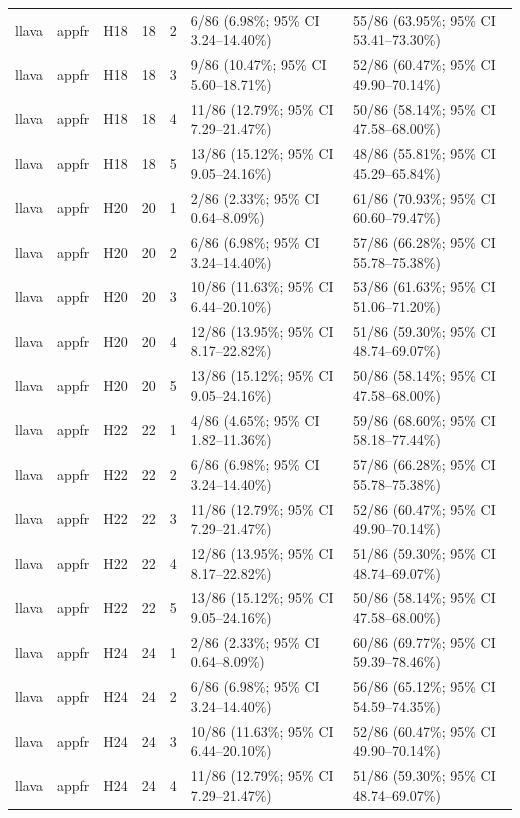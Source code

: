 \begin{longtable}{lllrrll}
llava & appfr & H18 & 18 & 2 & 6/86 (6.98\%; 95\% CI 3.24–14.40\%) & 55/86 (63.95\%; 95\% CI 53.41–73.30\%) \\
llava & appfr & H18 & 18 & 3 & 9/86 (10.47\%; 95\% CI 5.60–18.71\%) & 52/86 (60.47\%; 95\% CI 49.90–70.14\%) \\
llava & appfr & H18 & 18 & 4 & 11/86 (12.79\%; 95\% CI 7.29–21.47\%) & 50/86 (58.14\%; 95\% CI 47.58–68.00\%) \\
llava & appfr & H18 & 18 & 5 & 13/86 (15.12\%; 95\% CI 9.05–24.16\%) & 48/86 (55.81\%; 95\% CI 45.29–65.84\%) \\
llava & appfr & H20 & 20 & 1 & 2/86 (2.33\%; 95\% CI 0.64–8.09\%) & 61/86 (70.93\%; 95\% CI 60.60–79.47\%) \\
llava & appfr & H20 & 20 & 2 & 6/86 (6.98\%; 95\% CI 3.24–14.40\%) & 57/86 (66.28\%; 95\% CI 55.78–75.38\%) \\
llava & appfr & H20 & 20 & 3 & 10/86 (11.63\%; 95\% CI 6.44–20.10\%) & 53/86 (61.63\%; 95\% CI 51.06–71.20\%) \\
llava & appfr & H20 & 20 & 4 & 12/86 (13.95\%; 95\% CI 8.17–22.82\%) & 51/86 (59.30\%; 95\% CI 48.74–69.07\%) \\
llava & appfr & H20 & 20 & 5 & 13/86 (15.12\%; 95\% CI 9.05–24.16\%) & 50/86 (58.14\%; 95\% CI 47.58–68.00\%) \\
llava & appfr & H22 & 22 & 1 & 4/86 (4.65\%; 95\% CI 1.82–11.36\%) & 59/86 (68.60\%; 95\% CI 58.18–77.44\%) \\
llava & appfr & H22 & 22 & 2 & 6/86 (6.98\%; 95\% CI 3.24–14.40\%) & 57/86 (66.28\%; 95\% CI 55.78–75.38\%) \\
llava & appfr & H22 & 22 & 3 & 11/86 (12.79\%; 95\% CI 7.29–21.47\%) & 52/86 (60.47\%; 95\% CI 49.90–70.14\%) \\
llava & appfr & H22 & 22 & 4 & 12/86 (13.95\%; 95\% CI 8.17–22.82\%) & 51/86 (59.30\%; 95\% CI 48.74–69.07\%) \\
llava & appfr & H22 & 22 & 5 & 13/86 (15.12\%; 95\% CI 9.05–24.16\%) & 50/86 (58.14\%; 95\% CI 47.58–68.00\%) \\
llava & appfr & H24 & 24 & 1 & 2/86 (2.33\%; 95\% CI 0.64–8.09\%) & 60/86 (69.77\%; 95\% CI 59.39–78.46\%) \\
llava & appfr & H24 & 24 & 2 & 6/86 (6.98\%; 95\% CI 3.24–14.40\%) & 56/86 (65.12\%; 95\% CI 54.59–74.35\%) \\
llava & appfr & H24 & 24 & 3 & 10/86 (11.63\%; 95\% CI 6.44–20.10\%) & 52/86 (60.47\%; 95\% CI 49.90–70.14\%) \\
llava & appfr & H24 & 24 & 4 & 11/86 (12.79\%; 95\% CI 7.29–21.47\%) & 51/86 (59.30\%; 95\% CI 48.74–69.07\%) \\

\end{longtable}
